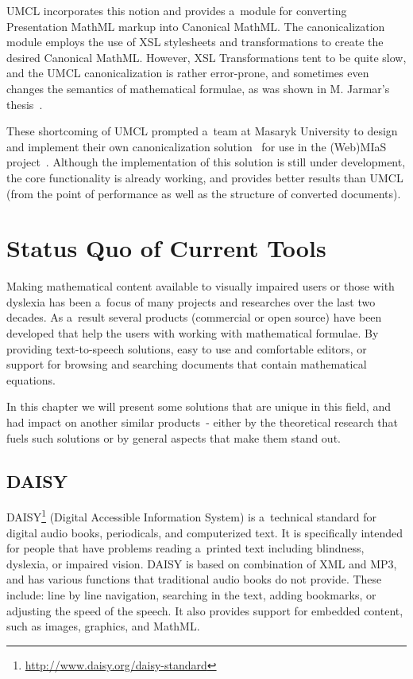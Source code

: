 \documentclass[11pt,oneside,final]{fithesis2}
\begin{document}
UMCL incorporates this notion and provides a~module for converting Presentation MathML markup into Canonical MathML. The canonicalization module employs the use of XSL stylesheets and transformations to create the desired Canonical MathML. However, XSL Transformations tent to be quite slow, and the UMCL canonicalization is rather error-prone, and sometimes even changes the semantics of mathematical formulae, as was shown in M. Jarmar's thesis~\cite[chapter 5]{umcl:jarmar2012conversion}. 

These shortcoming of UMCL prompted a~team at Masaryk University to design and implement their own canonicalization solution~\cite{canonicalization:formaneketal} for use in the (Web)MIaS project~\cite{mias:sojka2011indexing}. Although the implementation of this solution is still under development, the core functionality is already working, and provides better results than UMCL (from the point of performance as well as the structure of converted documents). 

\chapter{Status Quo of Current Tools}
\label{chapter:statusquo}
Making mathematical content available to visually impaired users or those with dyslexia has been a~focus of many projects and researches over the last two decades. As a~result several products (commercial or open source) have been developed that help the users with working with mathematical formulae. By providing text-to-speech solutions, easy to use and comfortable editors, or support for browsing and searching documents that contain mathematical equations.

In this chapter we will present some solutions that are unique in this field, and had impact on another similar products~- either by the theoretical research that fuels such solutions or by general aspects that make them stand out. 

\section{DAISY}
DAISY\footnote{\url{http://www.daisy.org/daisy-standard}} (Digital Accessible Information System) is a~technical standard for digital audio books, periodicals, and computerized text. It is specifically intended for people that have problems reading a~printed text including blindness, dyslexia, or impaired vision. DAISY is based on combination of XML and MP3, and has various functions that traditional audio books do not provide. These include: line by line navigation, searching in the text, adding bookmarks, or adjusting the speed of the speech. It also provides support for embedded content, such as images, graphics, and MathML. 
\end{document}
